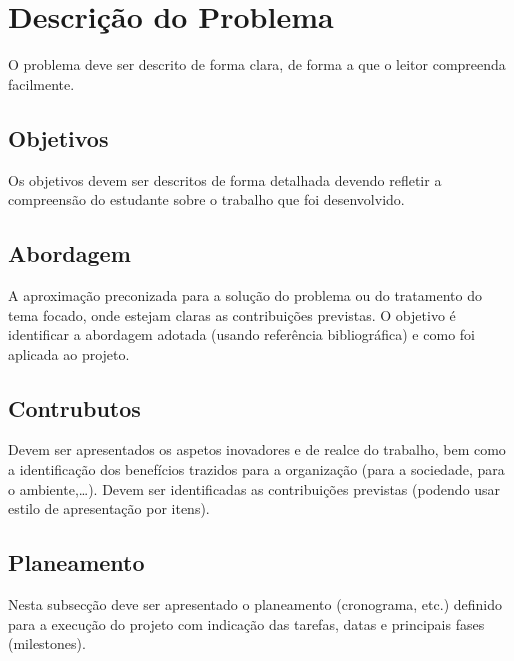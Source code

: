 \section{Descri\c{c}\~ao do Problema} %
\label{sec:problem}

O problema deve ser descrito de forma clara, de forma a que o leitor compreenda facilmente.

\subsection{Objetivos} %
\label{sec:objetivos}

Os objetivos devem ser descritos de forma detalhada devendo refletir a compreensão do estudante sobre o trabalho que foi desenvolvido.


\subsection{Abordagem} %
\label{sec:abordagem}

A aproximação preconizada para a solução do problema ou do tratamento do tema focado, onde estejam claras as contribuições previstas. O objetivo é identificar a abordagem adotada (usando referência bibliográfica) e como foi aplicada ao projeto.


\subsection{Contrubutos} %
\label{sec:contrubutos}

Devem ser apresentados os aspetos inovadores e de realce do trabalho, bem como a identificação dos benefícios trazidos para a organização (para a sociedade, para o ambiente,…). Devem ser identificadas as contribuições previstas (podendo usar estilo de apresentação por itens).


\subsection{Planeamento} %
\label{sec:planeamento}

Nesta subsecção deve ser apresentado o planeamento (cronograma, etc.) definido para a execução do projeto com indicação das tarefas, datas e principais fases (milestones).


